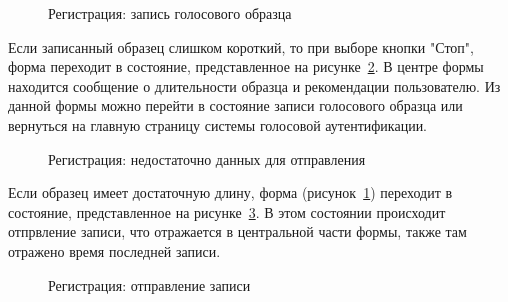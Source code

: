 \begin{figure}[hbt!]
\caption{Регистрация: запись голосового образца}
\label{fig:enrollment_recording}
\end{figure}

Если записанный образец слишком короткий, то при выборе кнопки "Стоп", форма переходит в состояние, представленное на рисунке~\ref{fig:enrollment_too_short_to_upload}. В центре формы находится сообщение о длительности образца и рекомендации пользователю. Из данной формы можно перейти в состояние записи голосового образца или вернуться на главную страницу системы голосовой аутентификации.


\begin{figure}[hbt!]
\caption{Регистрация: недостаточно данных для отправления}
\label{fig:enrollment_too_short_to_upload}
\end{figure}

Если образец имеет достаточную длину, форма (рисунок~\ref{fig:enrollment_recording}) переходит в состояние, представленное на рисунке~\ref{fig:enrollment_uploading}. В этом состоянии происходит отпрвление записи, что отражается в  центральной части формы, также там отражено время последней записи. 


\begin{figure}[hbt!]
\caption{Регистрация: отправление записи}
\label{fig:enrollment_uploading}
\end{figure}


